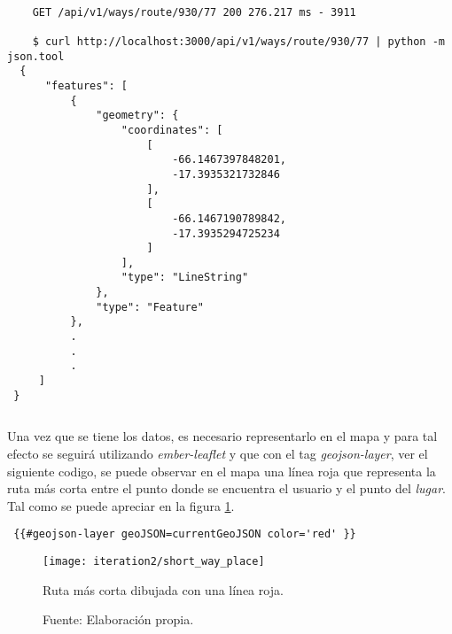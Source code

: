 \begin{center}
  \begin{lstlisting}[label=call_ways,caption=Llamada al \emph{endpoint} que retorna la ruta óptima.]

    GET /api/v1/ways/route/930/77 200 276.217 ms - 3911

    $ curl http://localhost:3000/api/v1/ways/route/930/77 | python -m json.tool
  {
      "features": [
          {
              "geometry": {
                  "coordinates": [
                      [
                          -66.1467397848201,
                          -17.3935321732846
                      ],
                      [
                          -66.1467190789842,
                          -17.3935294725234
                      ]
                  ],
                  "type": "LineString"
              },
              "type": "Feature"
          },
          .
          .
          .
     ]
 }

  \end{lstlisting}
\end{center}

\begin{verbatim}

\end{verbatim}

Una vez que se tiene los datos, es necesario representarlo en el mapa y para tal efecto se seguirá utilizando \emph{ember-leaflet} y que con el tag \emph{geojson-layer}, ver el siguiente codigo, se puede observar en el mapa una línea roja que representa la ruta más corta entre el punto donde se encuentra el usuario y el punto del \emph{lugar}. Tal como se puede apreciar en la figura \ref{fig:short_way_place}.
%
\begin{verbatim}
 {{#geojson-layer geoJSON=currentGeoJSON color='red' }}
\end{verbatim}


\begin{figure}[H]
 \begin{center}
   \texttt{[image: iteration2/short\_way\_place]}
   \caption{Ruta más corta dibujada con una línea roja.}
   \label{fig:short_way_place}
   \caption*{Fuente: Elaboración propia.}
 \end{center}
\end{figure}



